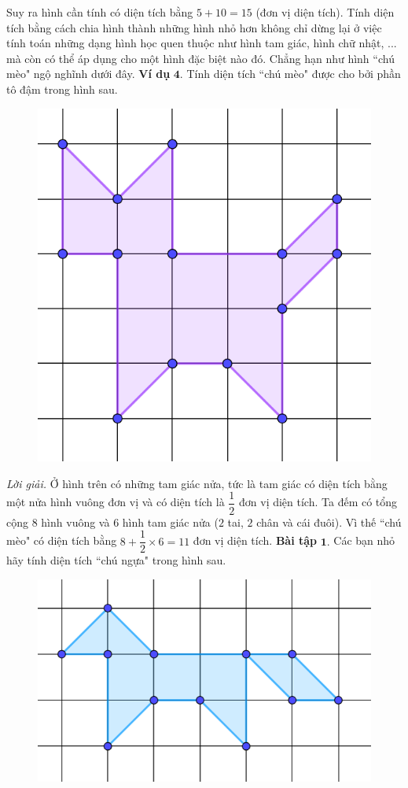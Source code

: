 \begin{multicols}{2}
	\vskip 0.1cm
	Suy ra hình cần tính có diện tích bằng $5+10=15$ (đơn vị diện tích). 
	\vskip 0.1cm
	Tính diện tích bằng cách chia hình thành những hình nhỏ hơn không chỉ dừng lại ở việc tính toán những dạng hình học quen thuộc như hình tam giác, hình chữ nhật, ... mà còn có thể áp dụng cho một hình đặc biệt nào đó. Chẳng hạn như hình ``chú mèo" ngộ nghĩnh dưới đây. 
	\vskip 0.1cm 
	\textbf{\color{toancuabi}Ví dụ} $\pmb{4.}$ Tính diện tích ``chú mèo" được cho bởi phần tô đậm trong hình sau.
	\begin{figure}[H]
		\centering
		\vspace*{-5pt}
		\captionsetup{labelformat= empty, justification=centering}
		\includegraphics[width=0.5\linewidth]{8}
		\vspace*{-10pt}
	\end{figure}
	\textit{Lời giải.} Ở hình trên có những tam giác nửa, tức là tam giác có diện tích bằng một nửa hình vuông đơn vị và có diện tích là $\dfrac{1}{2}$ đơn vị diện tích. Ta đếm có tổng cộng $8$ hình vuông và $6$ hình tam giác nửa ($2$ tai, $2$ chân và cái đuôi). Vì thế ``chú mèo" có diện tích bằng $8+\dfrac{1}{2}\times6=11$ đơn vị diện tích.
	\vskip 0.1cm
	\textbf{\color{toancuabi}Bài tập} $\pmb{1.}$ Các bạn nhỏ hãy tính diện tích ``chú ngựa" trong hình sau.
	\begin{figure}[H]
		\centering
		\vspace*{-5pt}
		\captionsetup{labelformat= empty, justification=centering}
		\includegraphics[width=0.58\linewidth]{9}

\end{figure}
\end{multicols}
